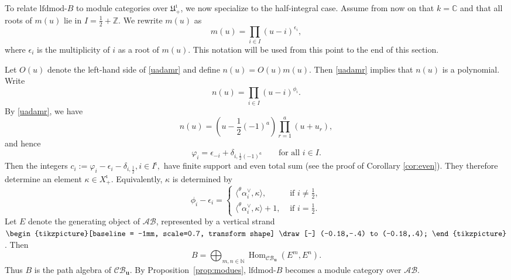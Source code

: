 \documentclass[a4,10pt]{amsart}
\numberwithin{equation}{section}
\def\Hom{\operatorname{Hom}}
\theoremstyle{definition}
\newcommand{\AB}{\mathcal{AB}}
\newcommand{\darkg}{\color{green!70!black}}
\begin{document}
To relate $\mathrm{lfdmod}$-$B$ to module categories over $\mathfrak U^\imath_+$,
we now specialize to the half-integral case. Assume from now on that
$k=\mathbb C$ and that all roots of $m(u)$ lie in
$
I=\frac12+\mathbb Z$.
We rewrite $m(u)$ as
\begin{equation}
\label{equ:poly}
    m(u)=\prod_{i\in I}(u-i)^{\epsilon_i},
\end{equation}
where $\epsilon_i$ is the multiplicity of $i$ as a root of $m(u)$. This notation
will be used from this point to the end of this section.

Let  $O(u)$ denote  the left-hand side of \eqref{uadamr} and define $n(u)=O(u) m(u)$. Then \eqref{uadamr} implies that $n(u)$ is a polynomial. 
Write \begin{equation}
\label{nuexp} n(u)=\prod_{i\in I} (u-i)^{\phi_i}.\end{equation}
By \eqref{uadamr}, we have
\[
n(u)=\left(u-\frac12(-1)^a\right)
\prod_{r=1}^a(u+u_r),
\]
and hence 
\[
\varphi_i
=
\epsilon_{-i}
+
\delta_{i,\frac12(-1)^a}
\qquad\text{for all }i\in I.
\]
Then the integers
\(
c_i
:=
\varphi_i-\epsilon_i-\delta_{i,\frac12},
i\in I^\imath,
\)
have finite support and even total sum (see the proof of Corollary \ref{cor:even}). They therefore determine
an element $\kappa\in X^\imath_+$. Equivalently, $\kappa$ is
determined by
\begin{equation}
\label{equ:phiminusepslon1}
   \phi_i-\epsilon_i= \begin{cases} \langle ^\theta\alpha_i^\vee,\kappa \rangle, & \text{ if } i\neq  \frac{1}{2},\\
    \langle ^\theta\alpha_i^\vee,\kappa \rangle+1, & \text{ if } i=  \frac{1}{2}.
   \end{cases}
\end{equation} 
Let $E$ denote the generating object of $\AB$, represented by a vertical strand $\begin{tikzpicture}[baseline = -1mm, scale=0.7, transform shape]
 	\draw[-] (-0.18,-.4) to (-0.18,.4);
\end{tikzpicture}$. Then  
\[B = \bigoplus_{m,n\in \mathbb N} \Hom_{\mathcal{CB}_\mathbf u}(E^m,E^n).\] 
Thus $B$ is the path algebra of $\mathcal {CB}_{\mathbf u}$. 
By Proposition~\ref{prop:modues}, 
 $\text{lfdmod-}B$ becomes a  module category over $\mathcal {AB}$. 
\end{document}
